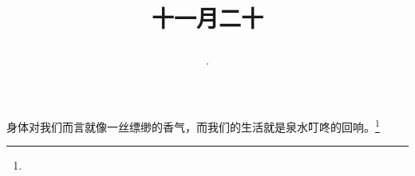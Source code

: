 \title{\date[d=1,m=1,y=2024][year:cn-y,年,month:cn,day:cn,日,·,weekday]·十一月二十 }
身体对我们而言就像一丝缥缈的香气，而我们的生活就是泉水叮咚的回响。\footnote{ }

